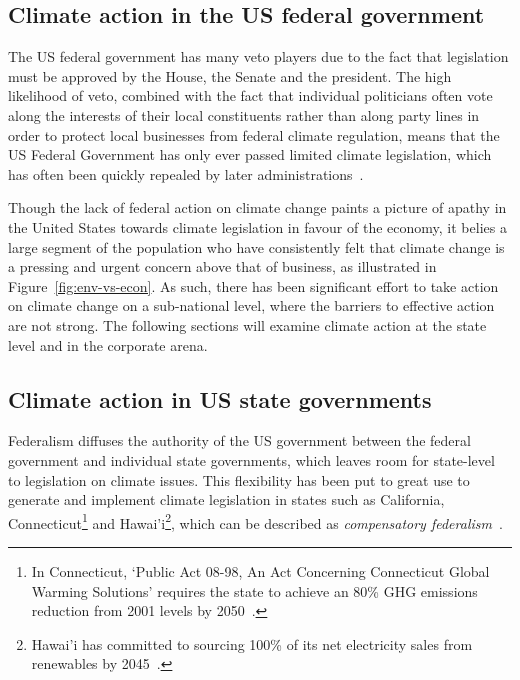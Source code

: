 \subsection{Climate action in the US federal government}

The US federal government has many veto players due to the fact that
legislation must be approved by the House, the Senate and the
president. The high likelihood of veto, combined with the fact that
individual politicians often vote along the interests of their local
constituents rather than along party lines in order to protect local
businesses from federal climate regulation, means that the US Federal
Government has only ever passed limited climate legislation, which has
often been quickly repealed by later
administrations~\citep{harrison2010united}.

Though the lack of federal action on climate change paints a picture
of apathy in the United States towards climate legislation in favour
of the economy, it belies a large segment of the population who have
consistently felt that climate change is a pressing and urgent concern
above that of business, as illustrated in
Figure~\ref{fig:env-vs-econ}. As such, there has been significant
effort to take action on climate change on a sub-national level, where
the barriers to effective action are not strong. The following
sections will examine climate action at the state level and in the
corporate arena.






\subsection{Climate action in US state governments}

Federalism diffuses the authority of the US government between the
federal government and individual state governments, which leaves room
for state-level to legislation on climate issues. This flexibility has
been put to great use to generate and implement climate legislation in
states such as California, Connecticut\footnote{In Connecticut,
  `Public Act 08-98, An Act Concerning Connecticut Global Warming
  Solutions' requires the state to achieve an 80\% GHG emissions
  reduction from 2001 levels by 2050~\citep{wearestillin-connecticut}.}
and Hawai'i\footnote{Hawai'i has committed to sourcing 100\% of its
  net electricity sales from renewables by
  2045~\citep{wearestillin-hawaii}.}, which can be described as
\textit{compensatory federalism}~\citep{balthasar2019energy}.

